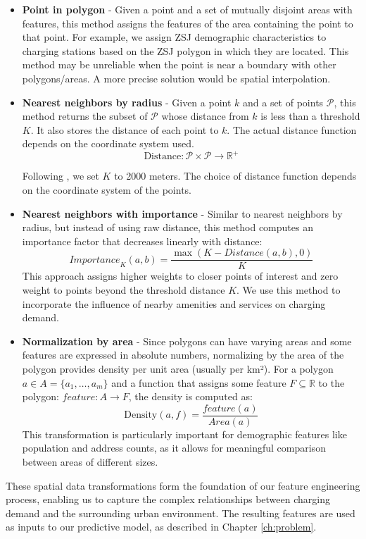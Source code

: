 \begin{itemize}
    \item[] \textbf{Point in polygon} - Given a point and a set of mutually disjoint areas with features, this method assigns the features of the area containing the point to that point. For example, we assign ZSJ demographic characteristics to charging stations based on the ZSJ polygon in which they are located. This method may be unreliable when the point is near a boundary with other polygons/areas. A more precise solution would be spatial interpolation.

    \item[] \textbf{Nearest neighbors by radius} - Given a point $k$ and a set of points $\mathcal{P}$, this method returns the subset of $\mathcal{P}$ whose distance from $k$ is less than a threshold $K$. It also stores the distance of each point to $k$. The actual distance function depends on the coordinate system used.
          \[ \text{Distance}: \mathcal{P} \times \mathcal{P} \rightarrow \mathbb{R}^+  \]

          Following , we set $K$ to 2000 meters. The choice of distance function depends on the coordinate system of the points.

    \item[] \textbf{Nearest neighbors with importance}  - Similar to nearest neighbors by radius, but instead of using raw distance, this method computes an importance factor that decreases linearly with distance:
          \[
              \textit{Importance}_K(a,b) = \frac{\max(K - \textit{Distance}(a,b), 0)}{K}
          \]
          This approach assigns higher weights to closer points of interest and zero weight to points beyond the threshold distance $K$. We use this method to incorporate the influence of nearby amenities and services on charging demand.

    \item[] \textbf{Normalization by area} - Since polygons can have varying areas and some features are expressed in absolute numbers, normalizing by the area of the polygon provides density per unit area (usually per km²). For a polygon $a \in A = \{a_1, \dots, a_m\}$ and a function that assigns some feature $F \subseteq \mathbb{R}$ to the polygon: $\textit{feature}: A \rightarrow F$, the density is computed as:
          \[ \text{Density}(a,f) = \frac{\textit{feature}(a)}{\textit{Area}(a)} \]
          This transformation is particularly important for demographic features like population and address counts, as it allows for meaningful comparison between areas of different sizes.
\end{itemize}

These spatial data transformations form the foundation of our feature engineering process, enabling us to capture the complex relationships between charging demand and the surrounding urban environment. The resulting features are used as inputs to our predictive model, as described in Chapter \ref{ch:problem}.
